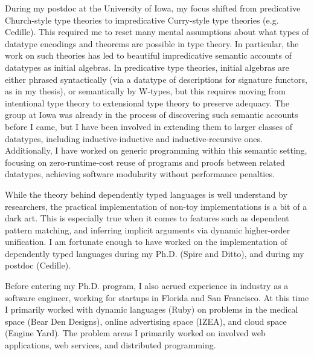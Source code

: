 \documentclass[11pt, a4paper]{awesome-cv}
\begin{document}
\begin{cvletter}

During my postdoc at the University of Iowa, my focus shifted from
predicative Church-style type theories to impredicative Curry-style
type theories (e.g. Cedille). This required me to reset many mental
assumptions about what types of datatype encodings and theorems are
possible in type theory. In particular, the work on such theories has
led to beautiful impredicative semantic accounts of datatypes as
initial algebras. In predicative type theories, initial algebras are
either phrased syntactically (via a datatype of descriptions for
signature functors, as in my thesis), or semantically by W-types, but
this requires moving from intentional type theory to extensional type
theory to preserve adequacy. The group at Iowa was already in the
process of discovering such semantic accounts before I came, but I
have been involved in extending them to larger classes of datatypes,
including inductive-inductive and inductive-recursive
ones. Additionally, I have worked on generic programming within this
semantic setting, focusing on zero-runtime-cost reuse of programs
and proofs between related datatypes, achieving software modularity
without performance penalties.


While the theory behind dependently typed languages is well understand
by researchers, the practical implementation of non-toy
implementations is a bit of a dark art. This is especially true when
it comes to features such as dependent pattern matching, and inferring
implicit arguments via dynamic higher-order unification. I am
fortunate enough to have worked on the implementation of dependently
typed languages during my Ph.D. (Spire and Ditto), and during my
postdoc (Cedille).

Before entering my Ph.D. program, I also acrued experience in industry
as a software engineer, working for startups in Florida and San
Francisco. At this time I primarily worked with dynamic languages
(Ruby) on problems in the medical space (Bear Den Designs), online
advertising space (IZEA), and cloud space (Engine Yard). The problem
areas I primarily worked on involved web applications, web services,
and distributed programming.

\end{cvletter}


\makeletterclosing
\end{document}

